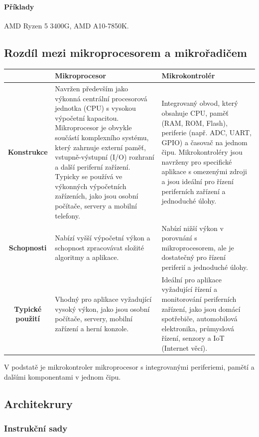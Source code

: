 \paragraph{Příklady} AMD Ryzen 5 3400G, AMD A10-7850K.

\subsection{Rozdíl mezi mikroprocesorem a mikrořadičem}
\begin{center}
\begin{tabular}{|c|p{5cm}|p{5cm}|}
\hline
 & \textbf{Mikroprocesor} & \textbf{Mikrokontrolér} \\
\hline
\textbf{Konstrukce} & 
Navržen především jako výkonná centrální procesorová jednotka (CPU) s vysokou výpočetní kapacitou. Mikroprocesor je obvykle součástí komplexního systému, který zahrnuje externí paměť, vstupně-výstupní (I/O) rozhraní a další periferní zařízení. Typicky se používá ve výkonných výpočetních zařízeních, jako jsou osobní počítače, servery a mobilní telefony. & 
Integrovaný obvod, který obsahuje CPU, paměť (RAM, ROM, Flash), periferie (např. ADC, UART, GPIO) a časovač na jednom čipu. Mikrokontroléry jsou navrženy pro specifické aplikace s omezenými zdroji a jsou ideální pro řízení periferních zařízení a jednoduché úlohy. \\
\hline
\textbf{Schopnosti} & 
Nabízí vyšší výpočetní výkon a schopnost zpracovávat složité algoritmy a aplikace. & 
Nabízí nižší výkon v porovnání s mikroprocesorem, ale je dostatečný pro řízení periferií a jednoduché úlohy. \\
\hline
\textbf{Typické použití} & 
Vhodný pro aplikace vyžadující vysoký výkon, jako jsou osobní počítače, servery, mobilní zařízení a herní konzole. & 
Ideální pro aplikace vyžadující řízení a monitorování periferních zařízení, jako jsou domácí spotřebiče, automobilová elektronika, průmyslová řízení, senzory a IoT (Internet věcí). \\
\hline
\end{tabular}
\end{center}
V podstatě je mikrokontroler mikroprocesor s integrovanými periferiemi, pamětí a dalšími komponentami v jednom čipu.

\subsection{Architekrury}
\subsubsection{Instrukční sady}
